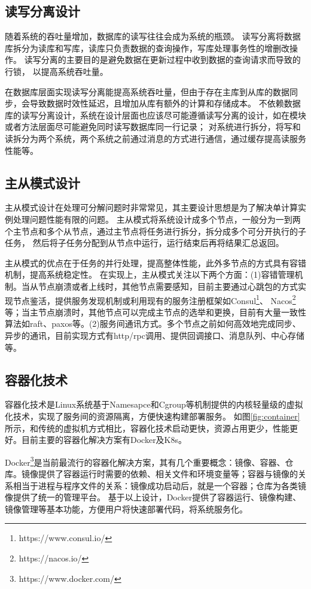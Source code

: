 \subsection{读写分离设计}
随着系统的吞吐量增加，数据库的读写往往会成为系统的瓶颈。
读写分离将数据库拆分为读库和写库，读库只负责数据的查询操作，写库处理事务性的增删改操作。
读写分离的主要目的是避免数据在更新过程中收到数据的查询请求而导致的行锁，
以提高系统吞吐量。

在数据库层面实现读写分离能提高系统吞吐量，但由于存在主库到从库的数据同步，会导致数据时效性延迟，且增加从库有额外的计算和存储成本。
不依赖数据库的读写分离设计，系统在设计层面也应该尽可能遵循读写分离的设计，如在模块或者方法层面尽可能避免同时读写数据库同一行记录；
对系统进行拆分，将写和读拆分为两个系统，两个系统之前通过消息的方式进行通信，通过缓存提高读服务性能等。

\subsection{主从模式设计}
主从模式设计在处理可分解问题时非常常见，其主要设计思想是为了解决单计算实例处理问题性能有限的问题。
主从模式将系统设计成多个节点，一般分为一到两个主节点和多个从节点，通过主节点将任务进行拆分，拆分成多个可分开执行的子任务，
然后将子任务分配到从节点中运行，运行结束后再将结果汇总返回。

主从模式的优点在于任务的并行处理，提高整体性能，此外多节点的方式具有容错机制，提高系统稳定性。
在实现上，主从模式关注以下两个方面：(1)容错管理机制。当从节点崩溃或者上线时，其他节点需要感知，目前主要通过心跳包的方式实现节点鉴活，提供服务发现机制或利用现有的服务注册框架如Consul\footnote{https://www.consul.io/}、 Nacos\footnote{https://nacos.io/}等；当主节点崩溃时，其他节点可以完成主节点的选举和更换，目前有大量一致性算法如raft、paxos等。(2)服务间通讯方式。多个节点之前如何高效地完成同步、异步的通讯，目前实现方式有http/rpc调用、提供回调接口、消息队列、中心存储等。

\subsection{容器化技术}
容器化技术是Linux系统基于Namesapce和Cgroup等机制提供的内核轻量级的虚拟化技术，实现了服务间的资源隔离，方便快速构建部署服务。
如图\ref{fig:container}所示，和传统的虚拟机方式相比，容器化技术启动更快，资源占用更少，性能更好。目前主要的容器化解决方案有Docker及K8s。

Docker\footnote{https://www.docker.com/}是当前最流行的容器化解决方案，其有几个重要概念：镜像、容器、仓库。镜像提供了容器运行时需要的依赖、相关文件和环境变量等；容器与镜像的关系相当于进程与程序文件的关系：镜像成功启动后，就是一个容器；仓库为各类镜像提供了统一的管理平台。
基于以上设计，Docker提供了容器运行、镜像构建、镜像管理等基本功能，方便用户将快速部署代码，将系统服务化。

